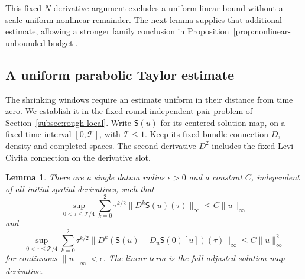 \documentclass[11pt]{article}
\numberwithin{equation}{section}
\newtheorem{lemma}[theorem]{Lemma}
\theoremstyle{definition}
\theoremstyle{remark}
\begin{document}
This fixed-\(N\) derivative argument excludes a uniform linear
bound without a scale-uniform nonlinear remainder. The next
lemma supplies that additional estimate, allowing a stronger
family conclusion in Proposition~\ref{prop:nonlinear-unbounded-budget}.



\subsection{A uniform parabolic Taylor estimate}
\label{subsec:uniform-parabolic-taylor}

The shrinking windows require an estimate uniform in their
distance from time zero. We establish it in the fixed round
independent-pair problem of Section~\ref{subsec:rough-local}.
Write \(\mathsf S(u)\) for its centered solution map, on a
fixed time interval \([0,\mathcal T]\), with \(\mathcal T\le1\).
Keep its fixed bundle connection \(D\), density and completed
spaces. The second derivative \(D^2\) includes the fixed
Levi--Civita connection on the derivative slot.

\begin{samepage}
\begin{lemma}
\label{lem:uniform-parabolic-taylor}
There are a single datum radius \(\epsilon>0\) and a constant
\(C\), independent of all initial spatial derivatives, such that
\[
 \sup_{0<\tau\le\mathcal T/4}
 \sum_{k=0}^2\tau^{k/2}\|D^k\mathsf S(u)(\tau)\|_\infty
 \le C\|u\|_\infty
\]
and
\[
 \sup_{0<\tau\le\mathcal T/4}
 \sum_{k=0}^2\tau^{k/2}
 \|D^k(\mathsf S(u)-D_u\mathsf S(0)[u])(\tau)\|_\infty
 \le C\|u\|_\infty^2
\]
for continuous \(\|u\|_\infty<\epsilon\).
The linear term is the full adjusted solution-map derivative.
\end{lemma}
\end{samepage}
\end{document}
